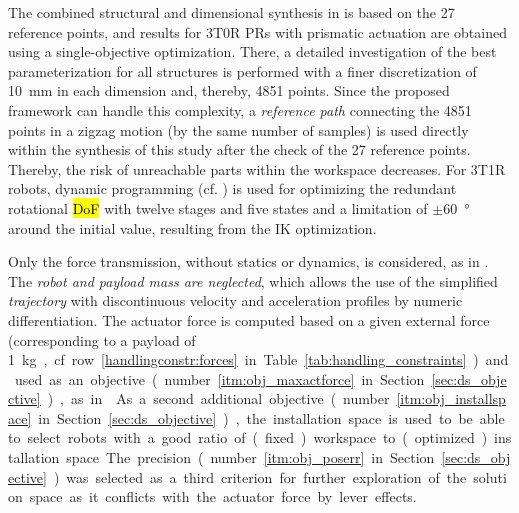 The combined structural and dimensional synthesis in \cite{PrauseChaCor2015} is based on the 27 reference points, and results for 3T0R PRs with prismatic actuation are obtained using a single-objective optimization. %
There, a detailed investigation of the best parameterization for all structures is performed with a finer discretization of \SI{10}{\milli\metre} in each dimension and, thereby, 4851 points.
Since the proposed framework can handle this complexity, a \emph{reference path} connecting the 4851 points in a zigzag motion (by the same number of samples) is used directly within the synthesis of this study after the check of the 27 reference points.
Thereby, the risk of unreachable parts within the workspace decreases.
For 3T1R robots, dynamic programming (cf. \cite{Schappler2023_ICINCOLNEE}) is used for optimizing the redundant rotational \hl{DoF} with twelve stages and five states %
and a limitation of $\pm$\SI{60}{\degree} around the initial value, resulting from the IK optimization.

Only the force transmission, without statics or dynamics, is considered, as in \cite{PrauseChaCor2015}.
The \emph{robot and payload mass are neglected}, which allows the use of the simplified \emph{trajectory} with discontinuous velocity and acceleration profiles by numeric differentiation.
The actuator force is computed based on a given external force (corresponding to a payload of \SI{1} kg, cf. row~\ref{handlingconstr:forces} in Table~\ref{tab:handling_constraints}) and used as an objective (number~\ref{itm:obj_maxactforce} in Section~\ref{sec:ds_objective}), as in \cite{PrauseChaCor2015}.
As a second additional objective (number~\ref{itm:obj_installspace} in Section~\ref{sec:ds_objective}), the installation space is used to be able to select robots with a good ratio of (fixed) workspace to (optimized) installation space.
The precision (number~\ref{itm:obj_poserr} in Section~\ref{sec:ds_objective}) was selected as a third criterion for further exploration of the solution space as it conflicts with the actuator force by lever effects.


